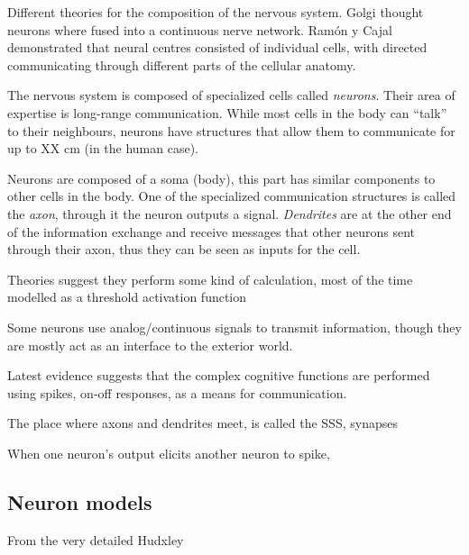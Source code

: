 Different theories for the composition of the nervous system.
Golgi thought neurons where fused into a continuous nerve network.
Ramón y Cajal demonstrated that neural centres consisted of individual cells, with directed communicating through different parts of the cellular anatomy.

The nervous system is composed of specialized cells called \emph{neurons}. Their area of expertise is long-range communication. While most cells in the body can ``talk'' to their neighbours, neurons have structures that allow them to communicate for up to XX cm (in the human case).

Neurons are composed of a soma (body), this part has similar components to other cells in the body. One of the specialized communication structures is called the \emph{axon}, through it the neuron outputs a signal. \emph{Dendrites} are at the other end of the information exchange and receive messages that other neurons sent through their axon, thus they can be seen as inputs for the cell.

Theories suggest they perform some kind of calculation, most of the time modelled as a threshold activation function

Some neurons use analog/continuous signals to transmit information, though they are mostly act as an interface to the exterior world.

Latest evidence suggests that the complex cognitive functions are performed using spikes, on-off responses, as a means for communication.

The place where axons and dendrites meet, is called the SSS, synapses

When one neuron's output elicits another neuron to spike, 

\subsection{Neuron models}

From the very detailed Hudxley 
